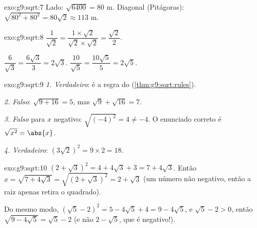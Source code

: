 \begin{solution}{exo:g9:sqrt:7}
Lado: $\sqrt{6400} = 80$ m. Diagonal (Pitágoras):
$\sqrt{80^2 + 80^2} = 80\sqrt2 \approx 113$ m.
\end{solution}

\begin{solution}{exo:g9:sqrt:8}
$\dfrac{1}{\sqrt2} = \dfrac{1 \times \sqrt2}{\sqrt2 \times \sqrt2}
= \dfrac{\sqrt2}{2}$.

$\dfrac{6}{\sqrt3} = \dfrac{6\sqrt3}{3} = 2\sqrt3$.
\quad
$\dfrac{10}{\sqrt5} = \dfrac{10\sqrt5}{5} = 2\sqrt5$.
\end{solution}

\begin{solution}{exo:g9:sqrt:9}
\emph{1. Verdadeiro}: é a regra do 
(\cref{thm:g9:sqrt:rules}).

\emph{2. Falso}: $\sqrt{9 + 16} = 5$, mas $\sqrt9 + \sqrt{16} = 7$.

\emph{3. Falso} para $x$ negativo: $\sqrt{(-4)^2} = 4 \neq -4$. O
enunciado correto é $\sqrt{x^2} = \abs{x}$.

\emph{4. Verdadeiro}: $\left(3\sqrt2\right)^2 = 9 \times 2 = 18$.
\end{solution}

\begin{solution}{exo:g9:sqrt:10}
$\left(2 + \sqrt3\right)^2 = 4 + 4\sqrt3 + 3 = 7 + 4\sqrt3$. Então
$x = \sqrt{7 + 4\sqrt3} = \sqrt{\left(2+\sqrt3\right)^2} = 2 + \sqrt3$
(um número não negativo, então a raiz apenas retira o quadrado).

Do mesmo modo, $\left(\sqrt5 - 2\right)^2 = 5 - 4\sqrt5 + 4 =
9 - 4\sqrt5$, e $\sqrt5 - 2 > 0$, então
$\sqrt{9 - 4\sqrt5} = \sqrt5 - 2$ (e não $2 - \sqrt5$, que é
negativo!).
\end{solution}

